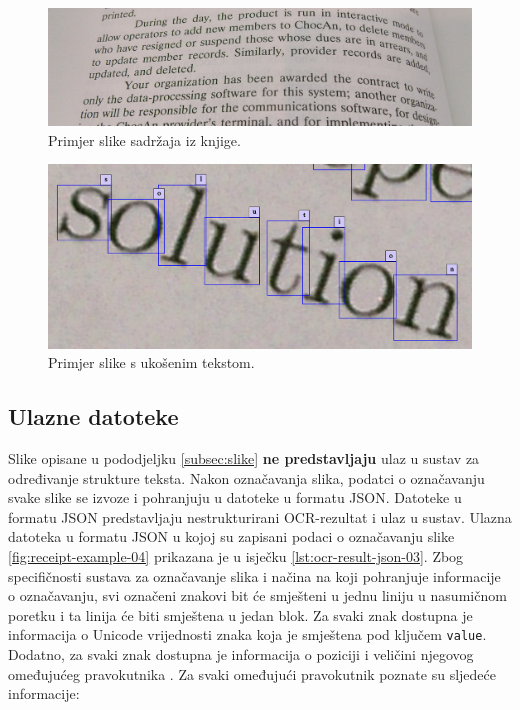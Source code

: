 \documentclass[times, utf8, zavrsni]{fer}
\begin{document}
\pagebreak

\begin{figure}[htb]
    \centering
    \captionsetup{justification=centering,margin=2cm}
    \includegraphics[width=\textwidth]{images/book-example-03.jpg}
    \caption{Primjer slike sadržaja iz knjige.}
    \label{fig:book-example-03}
\end{figure}

\begin{figure}[htb]
    \centering
    \captionsetup{justification=centering,margin=2cm}
    \includegraphics[width=\textwidth]{images/book-example-04.png}
    \caption{Primjer slike s ukošenim tekstom.}
    \label{fig:book-example-04}
\end{figure}

\pagebreak




\subsection{Ulazne datoteke}
\label{subsec:ulazne-datoteke}
Slike opisane u pododjeljku \ref{subsec:slike} \textbf{ne predstavljaju} ulaz u
sustav za određivanje strukture teksta. Nakon označavanja slika, podatci o
označavanju svake slike se izvoze i pohranjuju u datoteke u formatu JSON.
Datoteke u formatu JSON predstavljaju nestrukturirani OCR-rezultat i ulaz u
sustav. Ulazna datoteka u formatu JSON u kojoj su zapisani podaci o označavanju
slike \ref{fig:receipt-example-04} prikazana je u isječku
\ref{lst:ocr-result-json-03}. Zbog specifičnosti sustava za označavanje slika i
načina na koji pohranjuje informacije o označavanju, svi označeni znakovi bit
će smješteni u jednu liniju u nasumičnom poretku i ta linija će biti smještena
u jedan blok. Za svaki znak dostupna je informacija o Unicode vrijednosti znaka
koja je smještena pod ključem \lstinline{value}. Dodatno, za svaki znak
dostupna je informacija o poziciji i veličini njegovog omeđujućeg pravokutnika
. Za svaki omeđujući pravokutnik poznate su sljedeće
informacije:
\end{document}
